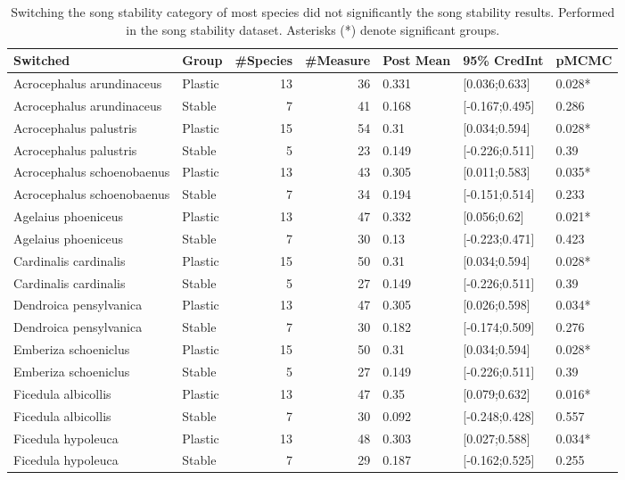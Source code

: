 \documentclass{article}
\begin{document}
  \begin{table}[H]
  \centering
  \caption{Switching the song stability category of most species did not significantly the song
  stability results. Performed in the song stability dataset. Asterisks (*) denote significant groups.}
  \begin{tabular}{llrrlll}
  \hline
  Switched & Group & \#Species & \#Measure & Post Mean & 95\% CredInt & pMCMC \\ 
  \hline
  Acrocephalus arundinaceus & Plastic & 13 & 36 & 0.331 & [0.036;0.633] & 0.028* \\ 
  Acrocephalus arundinaceus & Stable & 7 & 41 & 0.168 & [-0.167;0.495] & 0.286 \\ 
  Acrocephalus palustris & Plastic & 15 & 54 & 0.31 & [0.034;0.594] & 0.028* \\ 
  Acrocephalus palustris & Stable & 5 & 23 & 0.149 & [-0.226;0.511] & 0.39 \\ 
  Acrocephalus schoenobaenus & Plastic & 13 & 43 & 0.305 & [0.011;0.583] & 0.035* \\ 
  Acrocephalus schoenobaenus & Stable & 7 & 34 & 0.194 & [-0.151;0.514] & 0.233 \\ 
  Agelaius phoeniceus & Plastic & 13 & 47 & 0.332 & [0.056;0.62] & 0.021* \\ 
  Agelaius phoeniceus & Stable & 7 & 30 & 0.13 & [-0.223;0.471] & 0.423 \\ 
  Cardinalis cardinalis & Plastic & 15 & 50 & 0.31 & [0.034;0.594] & 0.028* \\ 
  Cardinalis cardinalis & Stable & 5 & 27 & 0.149 & [-0.226;0.511] & 0.39 \\ 
  Dendroica pensylvanica & Plastic & 13 & 47 & 0.305 & [0.026;0.598] & 0.034* \\ 
  Dendroica pensylvanica & Stable & 7 & 30 & 0.182 & [-0.174;0.509] & 0.276 \\ 
  Emberiza schoeniclus & Plastic & 15 & 50 & 0.31 & [0.034;0.594] & 0.028* \\ 
  Emberiza schoeniclus & Stable & 5 & 27 & 0.149 & [-0.226;0.511] & 0.39 \\ 
  Ficedula albicollis & Plastic & 13 & 47 & 0.35 & [0.079;0.632] & 0.016* \\ 
  Ficedula albicollis & Stable & 7 & 30 & 0.092 & [-0.248;0.428] & 0.557 \\ 
  Ficedula hypoleuca & Plastic & 13 & 48 & 0.303 & [0.027;0.588] & 0.034* \\ 
  Ficedula hypoleuca & Stable & 7 & 29 & 0.187 & [-0.162;0.525] & 0.255 \\ 

\end{tabular}
\end{table}
\end{document}
